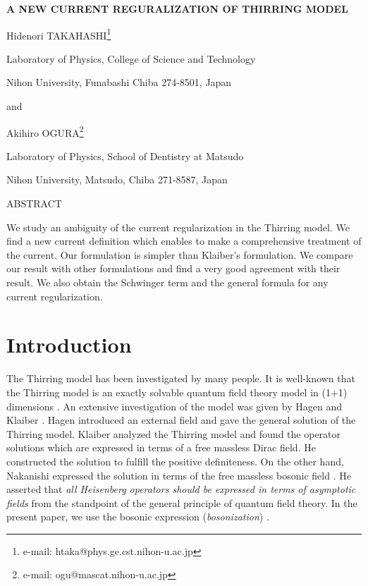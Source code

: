 \documentclass[a4paper,fleqn]{article}
\begin{document}
\thispagestyle{empty}
 \begin{center}
\begin{large}
 {\bf {  A NEW CURRENT REGURALIZATION OF THIRRING MODEL}}

\end{large}

\vspace{1cm}

Hidenori TAKAHASHI\footnote{e-mail: htaka@phys.ge.cst.nihon-u.ac.jp}

Laboratory of Physics, College of Science and Technology

Nihon University, Funabashi Chiba 274-8501, Japan 

\vspace{5mm}
and
\vspace{5mm}

Akihiro OGURA\footnote{e-mail: ogu@mascat.nihon-u.ac.jp}

Laboratory of Physics, School of Dentistry at Matsudo 

Nihon University, Matsudo, Chiba 271-8587, Japan

\vspace{2cm}

{\Large ABSTRACT}

\end{center}

We study an ambiguity of the current regularization in the Thirring model.
We find a new current definition which enables to make a comprehensive treatment
of the current. Our formulation is simpler than Klaiber's formulation.
We compare our result with other formulations and find
 a very good agreement with their result. We also obtain the Schwinger term and
the general formula for any current regularization.

\section{Introduction}
The Thirring model has been investigated by many people. 
It is well-known that the Thirring model is an exactly solvable quantum field theory model
in (1+1) dimensions \cite{thi58}.
An extensive investigation of the model was given by Hagen \cite{hagen1967}
and Klaiber \cite{kla67}.
Hagen introduced an external field and gave the general solution of the Thirring model.
Klaiber analyzed the Thirring model and found the operator solutions which are
expressed in terms of a free massless Dirac field.
He constructed the solution to fulfill the positive definiteness.
On the other hand, Nakanishi expressed the solution in terms of 
the free massless bosonic field \cite{nak77}.
He asserted that {\it all Heisenberg operators
 should be expressed in terms of asymptotic fields} from the standpoint of
 the general principle of quantum field theory.  In the present paper, 
we use the bosonic expression ({\it bosonization}) \cite{stone94,ogu94}. 
\end{document}
